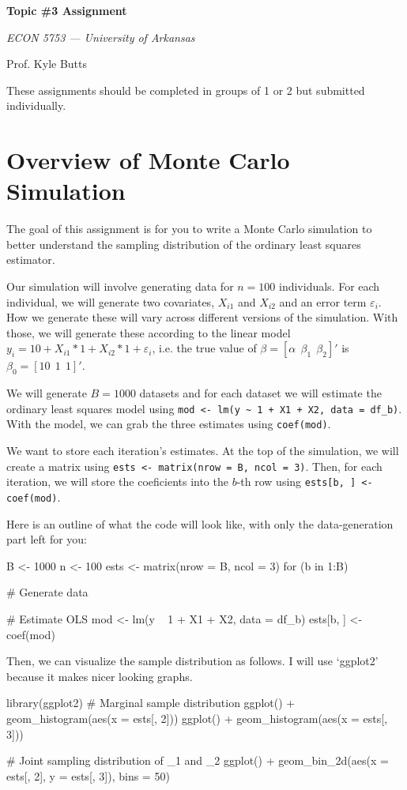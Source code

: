 \documentclass[12pt]{article}
\begin{document}
\begin{center}
  {\Huge\bf Topic \#3 Assignment}

  \smallskip
  {\large\it  ECON 5753 — University of Arkansas}

  \medskip
  {\large Prof. Kyle Butts}
\end{center}

These assignments should be completed in groups of 1 or 2 but submitted individually.

\section*{Overview of Monte Carlo Simulation}

The goal of this assignment is for you to write a Monte Carlo simulation to better understand the sampling distribution of the ordinary least squares estimator.

Our simulation will involve generating data for $n = 100$ individuals.
For each individual, we will generate two covariates, $X_{i1}$ and $X_{i2}$ and an error term $\varepsilon_i$. How we generate these will vary across different versions of the simulation. With those, we will generate these according to the linear model $y_i = 10 + X_{i1} * 1 + X_{i2} * 1 + \varepsilon_i$, i.e. the true value of $\beta = [\alpha \ \ \beta_1 \ \ \beta_2]'$ is $\beta_0 = [10 \ \ 1 \ \  1]'$.

We will generate $B = 1000$ datasets and for each dataset we will estimate the ordinary least squares model using \texttt{mod <- lm(y \textasciitilde \ 1 + X1 + X2, data = df\_b)}. With the model, we can grab the three estimates using \texttt{coef(mod)}.

We want to store each iteration's estimates. At the top of the simulation, we will create a matrix using \texttt{ests <- matrix(nrow = B, ncol = 3)}. Then, for each iteration, we will store the coeficients into the $b$-th row using \texttt{ests[b, ] <- coef(mod)}.

Here is an outline of what the code will look like, with only the data-generation part left for you:

\begin{codeblock}
B <- 1000
n <- 100
ests <- matrix(nrow = B, ncol = 3)
for (b in 1:B) {
  # Generate data

  # Estimate OLS
  mod <- lm(y ~ 1 + X1 + X2, data = df_b)
  ests[b, ] <- coef(mod)
}
\end{codeblock}

Then, we can visualize the sample distribution as follows. I will use `ggplot2' because it makes nicer looking graphs.
\begin{codeblock}
library(ggplot2)
# Marginal sample distribution
ggplot() +
  geom_histogram(aes(x = ests[, 2]))
ggplot() +
  geom_histogram(aes(x = ests[, 3]))

# Joint sampling distribution of \hat{\beta}_1 and \hat{\beta}_2
ggplot() +
  geom_bin_2d(aes(x = ests[, 2], y = ests[, 3]), bins = 50)
\end{codeblock}
\end{document}
